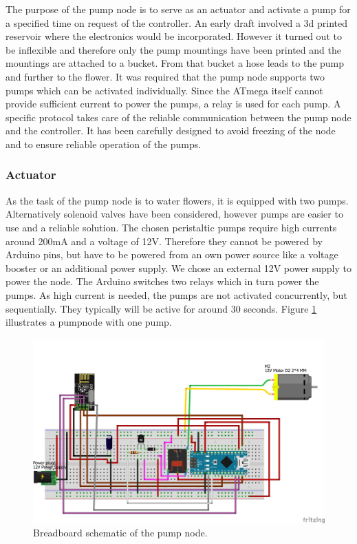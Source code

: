 The purpose of the pump node is to serve as an actuator and activate a pump for a specified time on request of the controller. An early draft involved a 3d printed reservoir where the electronics would be incorporated. However it turned out to be inflexible and therefore only the pump mountings have been printed and the mountings are attached to a bucket. From that bucket a hose leads to the pump and further to the flower.
It was required that the pump node supports two pumps which can be activated individually. Since the ATmega itself cannot provide sufficient current to power the pumps, a relay is used for each pump. %
A specific protocol takes care of the reliable communication between the pump node and the controller. It has been carefully designed to avoid freezing of the node and to ensure reliable operation of the pumps.\\

\subsubsection{Actuator}
As the task of the pump node is to water flowers, it is equipped with two pumps. Alternatively solenoid valves have been considered, however pumps are easier to use and a reliable solution. The chosen peristaltic pumps require high currents around 200mA and a voltage of 12V. Therefore they cannot be powered by Arduino pins, but have to be powered from an own power source like a voltage booster or an additional power supply. We chose an external 12V power supply to power the node.
The Arduino switches two relays which in turn power the pumps. As high current is needed, the pumps are not activated concurrently, but sequentially. They typically will be active for around 30 seconds.
Figure \ref{fig:pumpnode} illustrates a pumpnode with one pump.

\begin{figure}[H]
	\begin{center}
	\includegraphics[scale=0.6]{images/PlantPump.png}
	\caption{Breadboard schematic of the pump node.}
	\label{fig:pumpnode}
	\end{center}
\end{figure}

